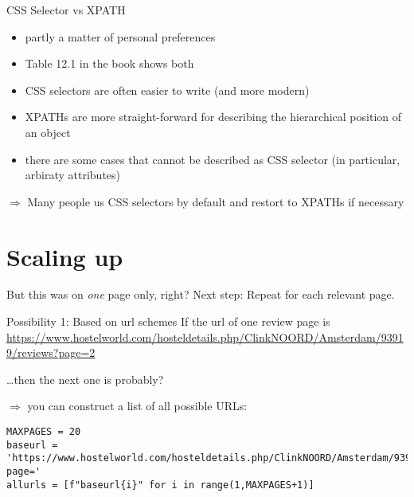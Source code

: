 \begin{frame}[fragile]{CSS Selector vs XPATH }
\begin{itemize}
	\item partly a matter of personal preferences
	\item Table 12.1 in the book shows both
	\item CSS selectors are often easier to write (and more modern)
	\item XPATHs are more straight-forward for describing the hierarchical position of an object
	\item there are some cases that cannot be described as CSS selector (in particular, arbiraty attributes)
\end{itemize}
$\Rightarrow$ Many people us CSS selectors by default and restort to XPATHs if necessary
\end{frame}













\section{Scaling up}




\begin{frame}[fragile]{But this was on \emph{one} page only, right?}
Next step: Repeat for each relevant page.

\begin{block}{Possibility 1: Based on url schemes}
	If the url of one review page is \url{https://www.hostelworld.com/hosteldetails.php/ClinkNOORD/Amsterdam/93919/reviews?page=2}

\ldots then the next one is probably?
\end{block}

\pause

$\Rightarrow$ you can construct a list of all possible URLs:

\begin{lstlisting}
MAXPAGES = 20
baseurl = 'https://www.hostelworld.com/hosteldetails.php/ClinkNOORD/Amsterdam/93919/reviews?page='
allurls = [f"baseurl{i}" for i in range(1,MAXPAGES+1)]
\end{lstlisting}	
	
\end{frame}



